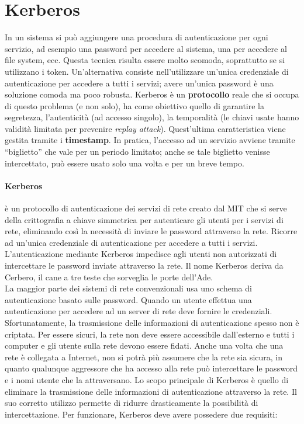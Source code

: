 \section{Kerberos}

In un sistema si può aggiungere una procedura di autenticazione per ogni servizio,
ad esempio una password per accedere al sistema, una per accedere al file system,
ecc. Questa tecnica risulta essere molto scomoda, soprattutto se si utilizzano
i token. Un’alternativa consiste nell’utilizzare un’unica credenziale di
autenticazione per accedere a tutti i servizi; avere un’unica password è una
soluzione comoda ma poco robusta.
Kerberos è un \textbf{protocollo} reale che si occupa di questo problema (e non solo),
ha come obiettivo quello di garantire la segretezza, l’autenticità
(ad accesso singolo), la temporalità (le chiavi usate hanno validità limitata
per prevenire \textit{replay attack}).
Quest’ultima caratteristica viene gestita tramite
i \textbf{timestamp}. In pratica, l’accesso ad un servizio avviene tramite
“biglietto” che vale per un periodo limitato; anche se tale biglietto venisse
intercettato, può essere usato solo una volta e per un breve tempo.

\paragraph{Kerberos}
è un protocollo di autenticazione dei servizi di rete creato dal MIT che si
serve della crittografia a chiave simmetrica per autenticare gli utenti per i
servizi di rete, eliminando così la necessità di inviare le password attraverso
la rete. Ricorre ad un’unica credenziale di autenticazione per accedere a tutti
i servizi. L'autenticazione mediante Kerberos impedisce agli utenti non autorizzati
di intercettare le password inviate attraverso la rete.
Il nome Kerberos deriva da Cerbero, il cane a tre teste che sorveglia
le porte dell’Ade.\\

La maggior parte dei sistemi di rete convenzionali usa uno schema di
autenticazione basato sulle password. Quando un utente effettua una
autenticazione per accedere ad un server di rete deve fornire le credenziali.
Sfortunatamente, la trasmissione delle informazioni di autenticazione spesso
non è criptata. Per essere sicuri, la rete non deve essere accessibile
dall'esterno e tutti i computer e gli utente sulla rete devono essere fidati.
Anche una volta che una rete è collegata a Internet, non si potrà più assumere
che la rete sia sicura, in quanto qualunque aggressore che ha accesso alla rete
può intercettare le password e i nomi utente che la attraversano.
Lo scopo principale di Kerberos è quello di eliminare la trasmissione delle
informazioni di autenticazione attraverso la rete.
Il suo corretto utilizzo permette di ridurre drasticamente la possibilità di
intercettazione. Per funzionare, Kerberos deve avere possedere due requisiti:

